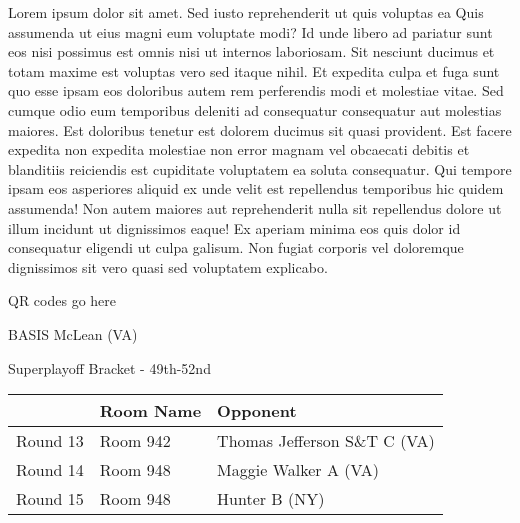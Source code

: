 \documentclass{article}%
\begin{document}
\vspace*{8pt}%
\linebreak%
\newline%
\newline%
Lorem ipsum dolor sit amet. Sed iusto reprehenderit ut quis voluptas ea Quis assumenda ut eius magni eum voluptate modi? Id unde libero ad pariatur sunt eos nisi possimus est omnis nisi ut internos laboriosam. Sit nesciunt ducimus et totam maxime est voluptas vero sed itaque nihil. Et expedita culpa et fuga sunt quo esse ipsam eos doloribus autem rem perferendis modi et molestiae vitae.\newline%
\newline%
Sed cumque odio eum temporibus deleniti ad consequatur consequatur aut molestias maiores. Est doloribus tenetur est dolorem ducimus sit quasi provident. Est facere expedita non expedita molestiae non error magnam vel obcaecati debitis et blanditiis reiciendis est cupiditate voluptatem ea soluta consequatur. Qui tempore ipsam eos asperiores aliquid ex unde velit est repellendus temporibus hic quidem assumenda!\newline%
\newline%
Non autem maiores aut reprehenderit nulla sit repellendus dolore ut illum incidunt ut dignissimos eaque! Ex aperiam minima eos quis dolor id consequatur eligendi ut culpa galisum. Non fugiat corporis vel doloremque dignissimos sit vero quasi sed voluptatem explicabo.\newline%
\newline%
%
\vspace*{30pt}%
\begin{center}%
\begin{Huge}%
QR codes go here%
\end{Huge}%
\end{center}%
\newpage%
\begin{center}%
\begin{Huge}%
BASIS McLean (VA)%
\end{Huge}%
\vspace*{8pt}%
\linebreak%
\begin{Large}%
Superplayoff Bracket {-} 49th{-}52nd%
\end{Large}%
\end{center}%
%
\begin{tabularx}{\textwidth}{|c|Y|Y|}%
\hline%
&Room Name&Opponent\\%
\hline%
Round 13&Room 942&Thomas Jefferson S\&T C (VA)\\%
Round 14&Room 948&Maggie Walker A (VA)\\%
Round 15&Room 948&Hunter B (NY)\\%
\hline%
\end{tabularx}%
\end{document}
